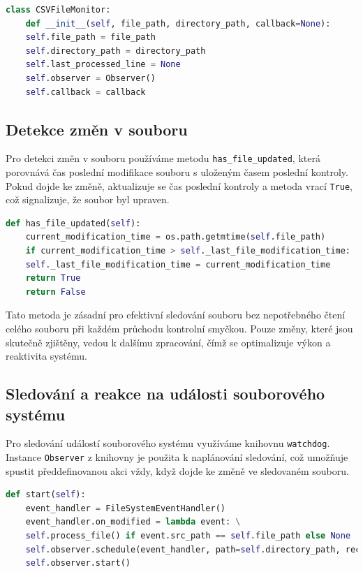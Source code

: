\documentclass[12pt, a4paper,
twoside,        %
openright
]{report}
\begin{document}
\begin{lstlisting}[language=Python, caption={Inicializace monitoru souboru}]
	class CSVFileMonitor:
	def __init__(self, file_path, directory_path, callback=None):
	self.file_path = file_path
	self.directory_path = directory_path
	self.last_processed_line = None
	self.observer = Observer()
	self.callback = callback
\end{lstlisting}

\subsection{Detekce změn v souboru}
Pro detekci změn v souboru používáme metodu \texttt{has\_file\_updated}, která porovnává čas poslední modifikace souboru s uloženým časem poslední kontroly. Pokud dojde ke změně, aktualizuje se čas poslední kontroly a metoda vrací \texttt{True}, což signalizuje, že soubor byl upraven.

\begin{lstlisting}[language=Python, caption={Detekce změn v CSV souboru}]
	def has_file_updated(self):
	current_modification_time = os.path.getmtime(self.file_path)
	if current_modification_time > self._last_file_modification_time:
	self._last_file_modification_time = current_modification_time
	return True
	return False
\end{lstlisting}

Tato metoda je zásadní pro efektivní sledování souboru bez nepotřebného čtení celého souboru při každém průchodu kontrolní smyčkou. Pouze změny, které jsou skutečně zjištěny, vedou k dalšímu zpracování, čímž se optimalizuje výkon a reaktivita systému.


\subsection{Sledování a reakce na události souborového systému}
Pro sledování událostí souborového systému využíváme knihovnu \texttt{watchdog}. Instance \texttt{Observer} z knihovny je použita k naplánování sledování, což umožňuje spustit předdefinovanou akci vždy, když dojde ke změně ve sledovaném souboru.

\begin{lstlisting}[language=Python, caption={Sledovani a reakce na zmeny souboru}]
	def start(self):
	event_handler = FileSystemEventHandler()
	event_handler.on_modified = lambda event: \
	self.process_file() if event.src_path == self.file_path else None
	self.observer.schedule(event_handler, path=self.directory_path, recursive=False)
	self.observer.start()
\end{lstlisting}
\end{document}
